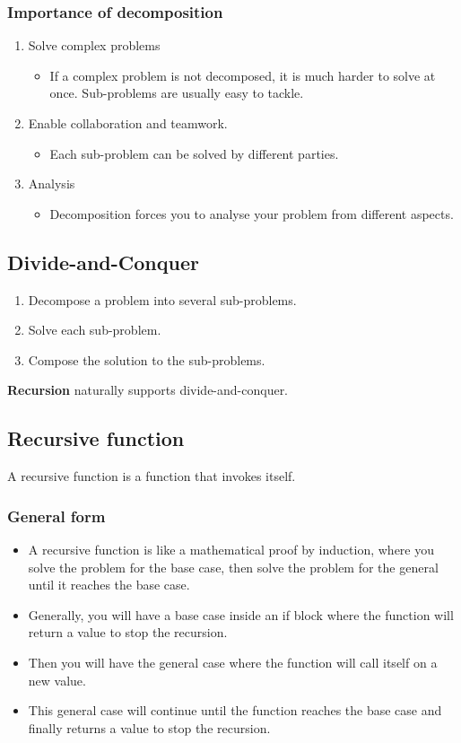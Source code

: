 \documentclass[11pt]{article}
\begin{document}
\subsubsection{Importance of decomposition}
\label{sec:orgad034b0}
\begin{enumerate}
\item Solve complex problems
\begin{itemize}
\item If a complex problem is not decomposed, it is much harder to solve at once. Sub-problems are usually easy to tackle.
\end{itemize}

\item Enable collaboration and teamwork.
\begin{itemize}
\item Each sub-problem can be solved by different parties.
\end{itemize}

\item Analysis
\begin{itemize}
\item Decomposition forces you to analyse your problem from different aspects.
\end{itemize}
\end{enumerate}
\subsection{Divide-and-Conquer}
\label{sec:orgfbbf76e}
\begin{enumerate}
\item Decompose a problem into several sub-problems.
\item Solve each sub-problem.
\item Compose the solution to the sub-problems.
\end{enumerate}

\textbf{Recursion} naturally supports divide-and-conquer.
\subsection{Recursive function}
\label{sec:org1328cd7}
A recursive function is a function that invokes itself.
\subsubsection{General form}
\label{sec:org84e6df7}
\begin{itemize}
\item A recursive function is like a mathematical proof by induction, where you solve the problem for the base case, then solve the problem for the general until it reaches the base case.
\item Generally, you will have a base case inside an if block where the function will return a value to stop the recursion.
\item Then you will have the general case where the function will call itself on a new value.
\item This general case will continue until the function reaches the base case and finally returns a value to stop the recursion.
\end{itemize}
\end{document}
